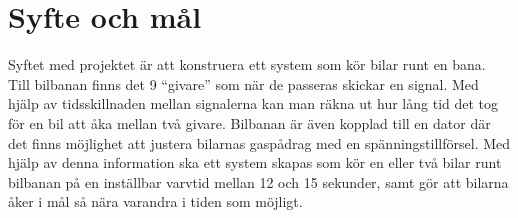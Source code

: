 \section{Syfte och mål}

Syftet med projektet är att konstruera ett system som kör bilar runt en
bana. Till bilbanan finns det 9 ``givare'' som när de passeras skickar en
signal. Med hjälp av tidsskillnaden mellan signalerna kan man räkna ut hur lång
tid det tog för en bil att åka mellan två givare. Bilbanan är även kopplad till
en dator där det finns möjlighet att justera bilarnas gaspådrag med en
spänningstillförsel. Med hjälp av denna information ska ett system skapas som
kör en eller två bilar runt bilbanan på en inställbar varvtid mellan 12 och 15
sekunder, samt gör att bilarna åker i mål så nära varandra i tiden som möjligt.
